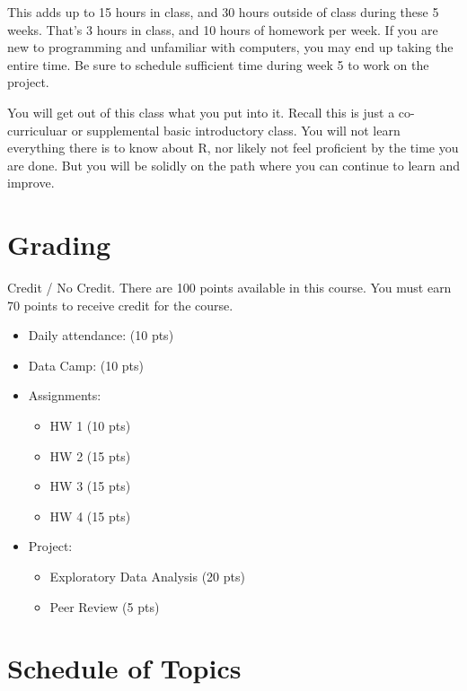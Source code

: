 \documentclass[11pt,]{article}
\providecommand{\tightlist}{%
  \setlength{\itemsep}{0pt}\setlength{\parskip}{0pt}}
\begin{document}
This adds up to 15 hours in class, and 30 hours outside of class during
these 5 weeks. That's 3 hours in class, and 10 hours of homework per
week. If you are new to programming and unfamiliar with computers, you
may end up taking the entire time. Be sure to schedule sufficient time
during week 5 to work on the project.

You will get out of this class what you put into it. Recall this is just
a co-curriculuar or supplemental basic introductory class. You will not
learn everything there is to know about R, nor likely not feel
proficient by the time you are done. But you will be solidly on the path
where you can continue to learn and improve.

\hypertarget{grading}{%
\section{Grading}\label{grading}}

Credit / No Credit. There are 100 points available in this course. You
must earn 70 points to receive credit for the course.

\begin{itemize}
\tightlist
\item
  Daily attendance: (10 pts)
\item
  Data Camp: (10 pts)
\item
  Assignments:

  \begin{itemize}
  \tightlist
  \item
    HW 1 (10 pts)
  \item
    HW 2 (15 pts)
  \item
    HW 3 (15 pts)
  \item
    HW 4 (15 pts)
  \end{itemize}
\item
  Project:

  \begin{itemize}
  \tightlist
  \item
    Exploratory Data Analysis (20 pts)
  \item
    Peer Review (5 pts)
  \end{itemize}
\end{itemize}

\hypertarget{schedule-of-topics}{%
\section{Schedule of Topics}\label{schedule-of-topics}}
\end{document}
